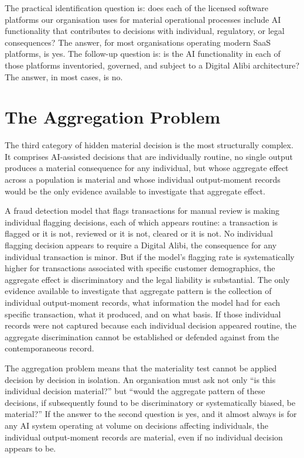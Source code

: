 The practical identification question is: does each of the licensed software platforms our organisation uses for material operational processes include AI functionality that contributes to decisions with individual, regulatory, or legal consequences? The answer, for most organisations operating modern SaaS platforms, is yes. The follow-up question is: is the AI functionality in each of those platforms inventoried, governed, and subject to a Digital Alibi architecture? The answer, in most cases, is no.

\section{The Aggregation Problem}

The third category of hidden material decision is the most structurally complex. It comprises AI-assisted decisions that are individually routine, no single output produces a material consequence for any individual, but whose aggregate effect across a population is material and whose individual output-moment records would be the only evidence available to investigate that aggregate effect.

A fraud detection model that flags transactions for manual review is making individual flagging decisions, each of which appears routine: a transaction is flagged or it is not, reviewed or it is not, cleared or it is not. No individual flagging decision appears to require a Digital Alibi, the consequence for any individual transaction is minor. But if the model's flagging rate is systematically higher for transactions associated with specific customer demographics, the aggregate effect is discriminatory and the legal liability is substantial. The only evidence available to investigate that aggregate pattern is the collection of individual output-moment records, what information the model had for each specific transaction, what it produced, and on what basis. If those individual records were not captured because each individual decision appeared routine, the aggregate discrimination cannot be established or defended against from the contemporaneous record.

The aggregation problem means that the materiality test cannot be applied decision by decision in isolation. An organisation must ask not only ``is this individual decision material?'' but ``would the aggregate pattern of these decisions, if subsequently found to be discriminatory or systematically biased, be material?'' If the answer to the second question is yes, and it almost always is for any AI system operating at volume on decisions affecting individuals, the individual output-moment records are material, even if no individual decision appears to be.

